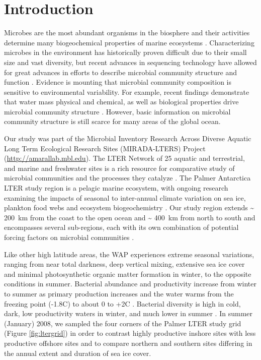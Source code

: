 \section{Introduction}\label{sc:introduction}

Microbes are the most abundant organisms in the biosphere and their activities determine many biogeochemical properties of marine ecosystems \citep{Azam1983-wo, pwah07}. Characterizing microbes in the environment has historically proven difficult due to their small size and vast diversity, but recent advances in sequencing technology have allowed for great advances in efforts to describe microbial community structure and function \citep{dk05,smhwhnah06,fstcscd08, Yooseph:2010aa}. Evidence is mounting that microbial community composition is sensitive to environmental variability. For example, recent findings demonstrate that water mass physical and chemical, as well as biological properties drive microbial community structure \citep{alnsh11}. However, basic information on microbial community structure is still scarce for many areas of the global ocean.

Our study was part of the Microbial Inventory Research Across Diverse Aquatic Long Term Ecological Research Sites (MIRADA-LTERS) Project (\url{http://amarallab.mbl.edu}). The LTER Network of 25 aquatic and terrestrial, and marine and freshwater sites is a rich resource for comparative study of microbial communities and the processes they catalyze \citep{rcfbdgghmmsww12, arm13}. The Palmer Antarctica LTER study region is a pelagic marine ecosystem, with ongoing research examining the impacts of seasonal to inter-annual climate variation on sea ice, plankton food webs and ecosystem biogeochemistry \citep{dcddghmmmms12}. Our study region extends \textasciitilde{} \SI{200}{\km} from the coast to the open ocean and \textasciitilde{} \SI{400}{\km} from north to south and encompasses several sub-regions, each with its own combination of potential forcing factors on microbial communities \citep{dsvse12}.

Like other high latitude areas, the WAP experiences extreme seasonal variations, ranging from near total darkness, deep vertical mixing, extensive sea ice cover and minimal photosynthetic organic matter formation in winter, to the opposite conditions in summer. Bacterial abundance and productivity increase from winter to summer as primary production increases and the water warms from the freezing point (-1.8\textdegree C) to about 0 to +2\textdegree C \citep{dsvse12}. Bacterial diversity is high in cold, dark, low productivity waters in winter, and much lower in summer \citep{mg07,grwddecm12}. In summer (January) 2008, we sampled the four corners of the Palmer LTER study grid (Figure \ref{fig:ltergrid}) in order to contrast highly productive inshore sites with less productive offshore sites and to compare northern and southern sites differing in the annual extent and duration of sea ice cover.

